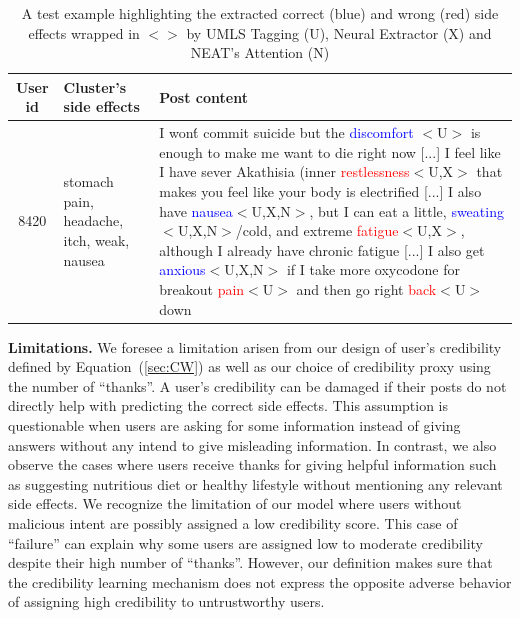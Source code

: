 \documentclass{bmcart}
\begin{document}
\begin{table}[t!]
  \captionsetup{justification=centering}
  \centering
  \scalebox{1.2}
  \footnotesize
  \begin{tabular}{c|p{3cm}|p{7cm}}
    \hline
    User id & Cluster's side effects & Post content \\ \hline \hline
    8420 & stomach pain, headache, itch, weak, nausea & I won\'t commit suicide but the \textcolor{blue}{discomfort} $<$U$>$ is enough to make me want to die right now [...] I feel like I have sever Akathisia (inner \textcolor{red}{restlessness}$<$U,X$>$ that makes you feel like your body is electrified [...] I also have \textcolor{blue}{nausea}$<$U,X,N$>$, but I can eat a little, \textcolor{blue}{sweating}$<$U,X,N$>$/cold, and extreme \textcolor{red}{fatigue}$<$U,X$>$, although I already have chronic fatigue [...] I also get \textcolor{blue}{anxious}$<$U,X,N$>$ if I take more oxycodone for breakout \textcolor{red}{pain}$<$U$>$ and then go right \textcolor{red}{back}$<$U$>$ down \\ \hline
  \end{tabular}
  \caption{A test example highlighting the extracted correct (blue) and wrong (red) side effects wrapped in $<>$ by UMLS Tagging (U), Neural Extractor (X) and NEAT's Attention (N)}\label{table:extraction_ex}
\end{table}

{\bf Limitations.} We foresee a limitation arisen from our design of user's credibility defined by Equation~(\ref{sec:CW}) as well as our choice of credibility proxy using the number of ``thanks''. A user's credibility can be damaged if their posts do not directly help with predicting the correct side effects. 
This assumption is questionable when users are asking for some information instead of giving answers without any intend to give misleading information. 
In contrast, we also observe the cases where users receive thanks for giving helpful information such as suggesting nutritious diet or healthy lifestyle without mentioning any relevant side effects. We recognize the limitation of our model where users without malicious intent are possibly assigned a low credibility score. This case of ``failure'' can explain why some users are assigned low to moderate credibility despite their high number of ``thanks''. However, our definition makes sure that the credibility learning mechanism does not express the opposite adverse behavior of assigning high credibility to untrustworthy users.
\end{document}
